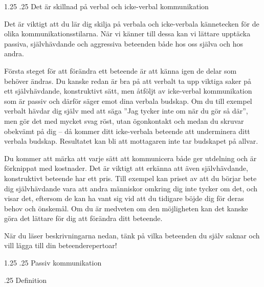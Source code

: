 \documentclass[swedish,a4paper]{book}
\makeatletter
\renewcommand\section{\@startsection{section}{1}{\z@}%
                                   {1.25\baselineskip}%
                                   {.25\baselineskip}%
                                   {\fontsize{1.25\baselineskip}{1.25\baselineskip}\selectfont\sffamily\bfseries}} %
\renewcommand\subsection{\@startsection{subsection}{1}{\z@}%
                                   {\baselineskip}%
                                   {.25\baselineskip}%
                                   {\fontsize{1\baselineskip}{1.25\baselineskip}\selectfont\sffamily\bfseries}} %
\makeatother
\begin{document}
\section{Det är skillnad på verbal och icke-verbal kommunikation}

Det är viktigt att du lär dig skilja på verbala och icke-verbala kännetecken för de olika kommunikationsstilarna. När vi känner till dessa kan vi lättare upptäcka passiva, självhävdande och aggressiva beteenden både hos oss själva och hos andra.

Första steget för att förändra ett beteende är att känna igen de delar som behöver ändras. Du kanske redan är bra på att verbalt ta upp viktiga saker på ett självhävdande, konstruktivt sätt, men åtföljt av icke-verbal kommunikation som är passiv och därför säger emot dina verbala budskap. Om du till exempel verbalt hävdar dig själv med att säga ''Jag tycker inte om när du gör så där'', men gör det med mycket svag röst, utan ögonkontakt och medan du skruvar obekvämt på dig -- då kommer ditt icke-verbala beteende att underminera ditt verbala budskap. Resultatet kan bli att mottagaren inte tar budskapet på allvar. 

Du kommer att märka att varje sätt att kommunicera både ger utdelning och är förknippat med kostnader. Det är viktigt att erkänna att även självhävdande, konstruktivt beteende har ett pris. Till exempel kan priset av att du börjar bete dig självhävdande vara att andra människor omkring dig inte tycker om det, och visar det, eftersom de kan ha vant sig vid att du tidigare böjde dig för deras behov och önskemål. Om du är medveten om den möjligheten kan det kanske göra det lättare för dig att förändra ditt beteende.

När du läser beskrivningarna nedan, tänk på vilka beteenden du själv saknar och vill lägga till din beteenderepertoar!

\pagebreak[4]\section{Passiv kommunikation}


\subsection{Definition}
\end{document}
